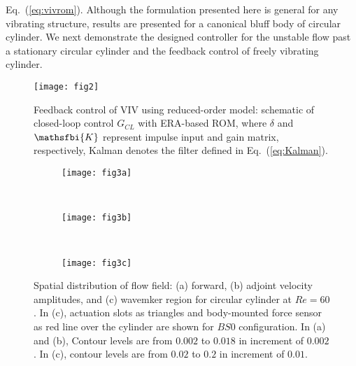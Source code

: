 \documentclass[standard]{jfm}
\begin{document}
Eq.~(\ref{eq:vivrom}).
Although the formulation presented here is general for any vibrating 
structure, results are presented for a canonical bluff body of circular cylinder.
%
We next demonstrate the designed controller for the unstable 
flow past a stationary circular cylinder and the feedback control of freely vibrating cylinder.
\begin{figure}
\centering
 \texttt{[image: fig2]}
	\caption{Feedback control of VIV using reduced-order model:
	         schematic of closed-loop control $G_{CL}$ with ERA-based ROM, 
             where $\delta$ and $\mathsfbi{K}$ represent  
             impulse input and gain matrix, respectively,
              Kalman denotes the filter defined in Eq.~(\ref{eq:Kalman}). }
	\label{fig:controlplant}
\end{figure}


\begin{figure}
\centering
\begin{minipage}{.4\textwidth}
\begin{subfigure}[b]{0.4\textwidth} 
\centering
  \texttt{[image: fig3a]}
	\caption{}
	\label{fig:re60_stability}
	\end{subfigure}	\\
\begin{subfigure}[b]{0.4\textwidth} 
\centering
  \texttt{[image: fig3b]} 
	\caption{}
	\label{fig:re60_receptivity}
	\end{subfigure}	\\			
\end{minipage}%
\begin{minipage}{.4\textwidth}
  \begin{subfigure}[c]{0.45\textwidth}
\centering
  \texttt{[image: fig3c]} 
    \caption{}
    \label{fig:wavemaker}
    \end{subfigure}  
\end{minipage} 

\caption{Spatial distribution of flow field: 
(a) forward, (b) adjoint velocity amplitudes, and 
(c) wavemker region for circular cylinder at $Re=60$. 
         In (c), actuation slots as triangles and body-mounted force sensor 
         as red line over the cylinder are shown for $BS0$ configuration.
         In (a) and (b), Contour levels are from $0.002$ to $0.018$ in increment of $0.002$.
         In (c), contour levels are from $0.02$ to $0.2$ in increment of $0.01$.
         }
\end{figure}
\end{document}
